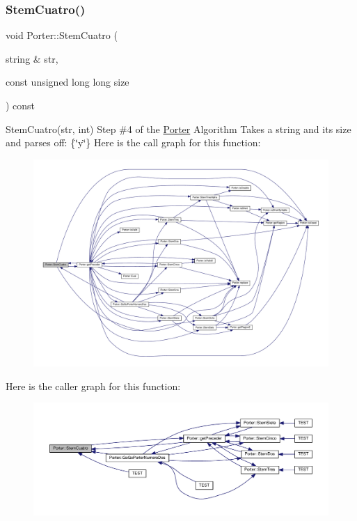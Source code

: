 \subsubsection{\texorpdfstring{Stem\+Cuatro()}{StemCuatro()}}
{\footnotesize\ttfamily void Porter\+::\+Stem\+Cuatro (\begin{DoxyParamCaption}\item[{string \&}]{str,  }\item[{const unsigned long long}]{size }\end{DoxyParamCaption}) const}

Stem\+Cuatro(str, int) Step \#4 of the \hyperlink{class_porter}{Porter} Algorithm Takes a string and its size and parses off\+: \{\char`\"{}y\char`\"{}\} Here is the call graph for this function\+:
\nopagebreak
\begin{figure}[H]
\begin{center}
\leavevmode
\includegraphics[width=350pt]{class_porter_aa1e1b416311f37b827bc093bb03ca500_cgraph}
\end{center}
\end{figure}
Here is the caller graph for this function\+:
\nopagebreak
\begin{figure}[H]
\begin{center}
\leavevmode
\includegraphics[width=350pt]{class_porter_aa1e1b416311f37b827bc093bb03ca500_icgraph}
\end{center}
\end{figure}
\mbox{\label{class_porter_a33838d3b5ab4963106a5c47c4a0c74e6}} 
